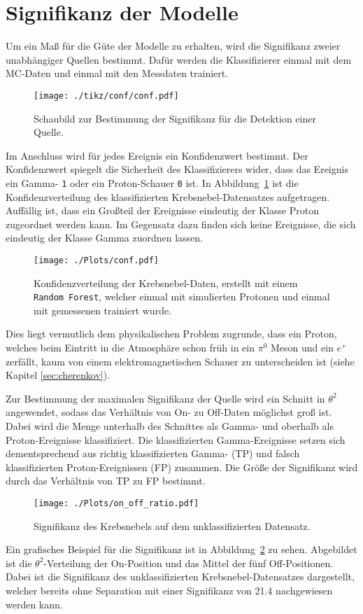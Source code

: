 \section{Signifikanz der Modelle}
Um ein Maß für die Güte der Modelle zu erhalten, wird die Signifikanz zweier unabhängiger Quellen bestimmt. 
Dafür werden die Klassifizierer einmal mit dem MC-Daten und einmal mit den Messdaten trainiert. 
\begin{figure}[H]
  \centering
  \texttt{[image: ./tikz/conf/conf.pdf]}
  \caption{Schaubild zur Bestimmung der Signifikanz für die Detektion einer Quelle.}
\end{figure}
Im Anschluss wird für jedes Ereignis ein Konfidenzwert bestimmt. 
Der Konfidenzwert spiegelt die Sicherheit des Klassifizierers wider, dass das Ereignis ein Gamma- \texttt{1} oder ein Proton-Schauer \texttt{0} ist. 
In Abbildung~\ref{fig:confdist} ist die Konfidenzverteilung des klassifizierten Krebsnebel-Datensatzes aufgetragen. 
Auffällig ist, dass ein Großteil der Ereignisse eindeutig der Klasse Proton zugeordnet werden kann. 
Im Gegensatz dazu finden sich keine Ereignisse, die sich eindeutig der Klasse Gamma zuordnen lassen.
\begin{figure}[H]
  \centering
  \texttt{[image: ./Plots/conf.pdf]}
  \caption{Konfidenzverteilung der Krebsnebel-Daten, erstellt mit einem \texttt{Random Forest}, welcher einmal mit simulierten Protonen und einmal mit gemessenen trainiert wurde.}
  \label{fig:confdist}
\end{figure}
Dies liegt vermutlich dem physikalischen Problem zugrunde, dass ein Proton, welches beim Eintritt in die Atmosphäre schon früh in ein $\pi^{0}$ Meson und ein $e^{+}$ zerfällt, kaum von einem elektromagnetischen Schauer zu unterscheiden ist (siehe Kapitel \ref{sec:cherenkov}).

Zur Bestimmung der maximalen Signifikanz der Quelle wird ein Schnitt in $\theta^{2}$ angewendet, sodass das Verhältnis von On- zu Off-Daten möglichst groß ist.
Dabei wird die Menge unterhalb des Schnittes als Gamma- und oberhalb als Proton-Ereignisse klassifiziert.
Die klassifizierten Gamma-Ereignisse setzen sich dementsprechend aus richtig klassifizierten Gamma- (TP) und falsch klassifizierten Proton-Ereignissen (FP) zusammen. 
Die Größe der Signifikanz wird durch das Verhältnis von TP zu FP bestimmt.
\begin{figure}[H]
  \centering
  \texttt{[image: ./Plots/on\_off\_ratio.pdf]}
  \caption{Signifikanz des Krebsnebels auf dem unklassifizierten Datensatz.}
  \label{fig:sig_crab}
\end{figure}
Ein grafisches Beispiel für die Signifikanz ist in Abbildung~\ref{fig:sig_crab} zu sehen. 
Abgebildet ist die $\theta^{2}$-Verteilung der On-Position und das Mittel der fünf Off-Positionen.
Dabei ist die Signifikanz des unklassifizierten Krebsnebel-Datensatzes dargestellt, welcher bereits ohne Separation mit einer Signifikanz von \SI{21,4}{\sigma} nachgewiesen werden kann.

